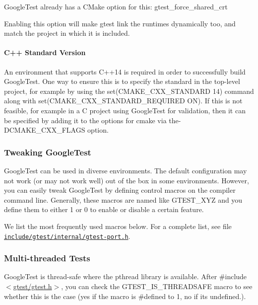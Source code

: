 Google\+Test already has a C\+Make option for this\+: {\ttfamily gtest\+\_\+force\+\_\+shared\+\_\+crt}

Enabling this option will make gtest link the runtimes dynamically too, and match the project in which it is included.

\paragraph*{C++ Standard Version}

An environment that supports C++14 is required in order to successfully build Google\+Test. One way to ensure this is to specify the standard in the top-\/level project, for example by using the {\ttfamily set(\+C\+M\+A\+K\+E\+\_\+\+C\+X\+X\+\_\+\+S\+T\+A\+N\+D\+A\+R\+D 14)} command along with {\ttfamily set(\+C\+M\+A\+K\+E\+\_\+\+C\+X\+X\+\_\+\+S\+T\+A\+N\+D\+A\+R\+D\+\_\+\+R\+E\+Q\+U\+I\+R\+E\+D O\+N)}. If this is not feasible, for example in a C project using Google\+Test for validation, then it can be specified by adding it to the options for cmake via the{\ttfamily -\/\+D\+C\+M\+A\+K\+E\+\_\+\+C\+X\+X\+\_\+\+F\+L\+A\+GS} option.

\subsubsection*{Tweaking Google\+Test}

Google\+Test can be used in diverse environments. The default configuration may not work (or may not work well) out of the box in some environments. However, you can easily tweak Google\+Test by defining control macros on the compiler command line. Generally, these macros are named like {\ttfamily G\+T\+E\+S\+T\+\_\+\+X\+YZ} and you define them to either 1 or 0 to enable or disable a certain feature.

We list the most frequently used macros below. For a complete list, see file \href{https://github.com/google/googletest/blob/main/googletest/include/gtest/internal/gtest-port.h}{\tt include/gtest/internal/gtest-\/port.\+h}.

\subsubsection*{Multi-\/threaded Tests}

Google\+Test is thread-\/safe where the pthread library is available. After {\ttfamily \#include $<$\mbox{\hyperlink{gtest_8h_source}{gtest/gtest.\+h}}$>$}, you can check the {\ttfamily G\+T\+E\+S\+T\+\_\+\+I\+S\+\_\+\+T\+H\+R\+E\+A\+D\+S\+A\+FE} macro to see whether this is the case (yes if the macro is {\ttfamily \#defined} to 1, no if it\textquotesingle{}s undefined.).

